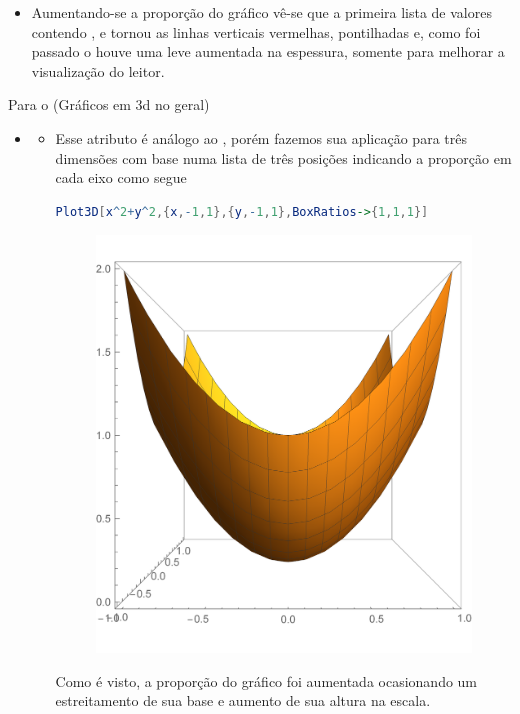 \documentclass[a4paper, 12pt]{article}
\begin{document}
\begin{itemize}
	\begin{itemize}
		\item[] Aumentando-se a proporção do gráfico vê-se que a primeira lista de valores contendo ,  e  tornou as linhas verticais vermelhas, pontilhadas e, como foi passado o  houve uma leve aumentada na espessura, somente para melhorar a visualização do leitor.
	\end{itemize}

	\end{itemize}

	\newpage
	\vspace{.5cm}
	Para o  (Gráficos em 3d no geral) 
	\begin{itemize}
		\item{}
		\begin{itemize}
			\item Esse atributo é análogo ao , porém fazemos sua aplicação para três dimensões com base numa lista de três posições indicando a proporção em cada eixo como segue
			
\begin{lstlisting}[language=Mathematica]
Plot3D[x^2+y^2,{x,-1,1},{y,-1,1},BoxRatios->{1,1,1}]
\end{lstlisting}
			\begin{figure}[!h]
				\centering
				\includegraphics[scale=.35]{images/boxRatios}
			\end{figure}
			Como é visto, a proporção do gráfico foi aumentada ocasionando um estreitamento de sua base e aumento de sua altura na escala. 
			

\end{itemize}
\end{itemize}
\end{document}
